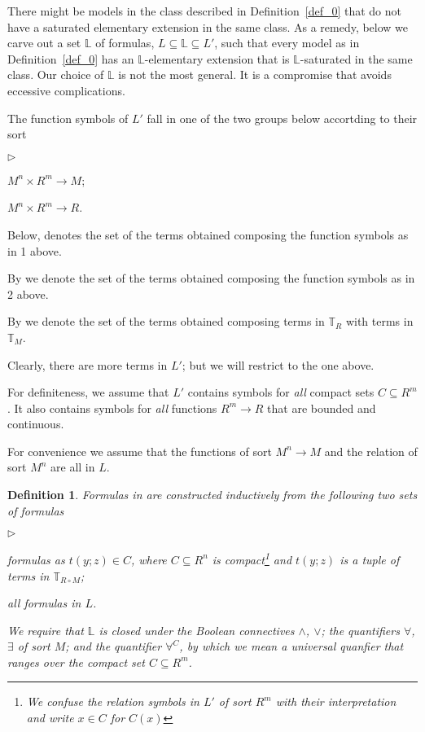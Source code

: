 \documentclass[12pt,letterpaper,oneside,reqno]{amsart}
\newcommand{\mylabel}[1]{{#1}\hfill}
\renewenvironment{itemize}
  {\begin{list}{$\triangleright$}{%
   \setlength{\parskip}{0mm}
   \setlength{\topsep}{.2\baselineskip}
   \setlength{\rightmargin}{0mm}
   \setlength{\listparindent}{0mm}
   \setlength{\itemindent}{0mm}
   \setlength{\labelwidth}{3ex}
   \setlength{\itemsep}{.2\baselineskip}
   \setlength{\parsep}{.2\baselineskip}
   \setlength{\partopsep}{0mm}
   \setlength{\labelsep}{1ex}
   \setlength{\leftmargin}{\labelwidth+\labelsep}
   \let\makelabel\mylabel}}{%
   \end{list}}
\theoremstyle{plain}
\newtheorem{definition}[theorem]{Definition}
\theoremstyle{remark}
\renewcommand*{\emph}[1]{%
   \smash{\tikz[baseline]\node[rectangle, fill=olive!25, rounded corners, inner xsep=0.5ex, inner ysep=0.2ex, anchor=base, minimum height = 2.7ex]{#1};}}
\begin{document}
  
There might be models in the class described in Definition~\ref{def_0} that do not have a saturated elementary extension in the same class.
As a remedy, below we carve out a set $\mathds{L}$ of formulas, $L\subseteq\mathds{L}\subseteq L'$, such that every model as in Definition~\ref{def_0} has an $\mathds{L}$-elementary extension that is $\mathds{L}$-saturated in the same class.
Our choice of $\mathds{L}$ is not the most general.
It is a compromise that avoids eccessive complications.

The function symbols of $L'$ fall in one of the two groups below accortding to their sort
  \begin{itemize}
    \item[1.] $M^n\times R^m\to M$;
    \item[2.] $M^n\times R^m\to R$.
  \end{itemize}
 
Below, \emph{$\mathds{T}_M$\/} denotes the set of the terms obtained composing the function symbols as in 1 above.

By \emph{$\mathds{T}_R$\/} we denote the set of the terms obtained composing the function symbols as in 2 above.

By \emph{$\mathds{T}_{R\circ M}$\/} we  denote the set of the terms obtained composing terms in $\mathds{T}_R$ with terms in $\mathds{T}_M$. 

Clearly, there are more terms in $L'$; but we will restrict to the one above.

For definiteness, we assume that $L'$ contains symbols for \textit{all\/} compact sets $C\subseteq R^m$.
It also contains symbols for \textit{all\/} functions $R^m\to R$ that are bounded and continuous.

For convenience we assume that the functions of sort $M^n\to M$ and the relation of sort $M^n$ are all in $L$.

\begin{definition}\label{def_LL}
  Formulas in \emph{$\mathds{L}$\/} are constructed inductively from the following two sets of formulas
  \begin{itemize}
  \item[i.] formulas as $t(y;z)\in C$, where $C\subseteq R^n$ is compact\footnote{We confuse the relation symbols in $L'$ of sort $R^m$ with their interpretation and write $x\in C$ for $C(x)$} and $t(y;z)$ is a tuple of terms in $\mathds{T}_{R\circ M}$; 
  \item[ii.] all formulas in $L$.
  \end{itemize}
  We require that $\mathds{L}$ is closed under the Boolean connectives $\wedge$, $\vee$; the quantifiers $\forall$, $\exists$ of sort $M$; and the quantifier $\forall^C$, by which we mean a universal quanfier that ranges over the compact set $C\subseteq R^m$.
\end{definition}
\end{document}
